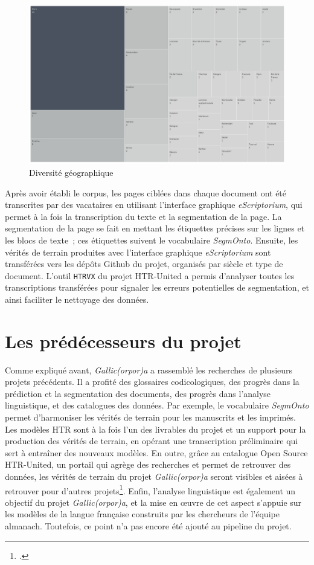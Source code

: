 \documentclass[class=article, crop=false]{standalone}
\begin{document}
\begin{figure}[hbt!]
\includegraphics[width=\textwidth]{../../../images/diversite_ville.png}
\caption{Diversité géographique}
\label{fig:diversite_ville}
\end{figure}

Après avoir établi le corpus, les pages ciblées dans chaque document ont été transcrites par des vacataires en utilisant l'interface graphique \textit{eScriptorium}, qui permet à la fois la transcription du texte et la segmentation de la page. La segmentation de la page se fait en mettant les étiquettes précises sur les lignes et les blocs de texte~; ces étiquettes suivent le vocabulaire \textit{SegmOnto}. Ensuite, les vérités de terrain produites avec l'interface graphique \textit{eScriptorium} sont transférées vers les dépôts Github du projet, organisés par siècle et type de document. L'outil \texttt{HTRVX} du projet \Gls{HTR-United} a permis d'analyser toutes les transcriptions transférées pour signaler les erreurs potentielles de segmentation, et ainsi faciliter le nettoyage des données.


\section{Les prédécesseurs du projet}
Comme expliqué avant, \textit{Gallic(orpor)a} a rassemblé les recherches de plusieurs projets précédents. Il a profité des glossaires codicologiques, des progrès dans la prédiction et la segmentation des documents, des progrès dans l'analyse linguistique, et des catalogues des données. Par exemple, le vocabulaire \textit{SegmOnto} permet d'harmoniser les vérités de terrain pour les manuscrits et les imprimés. Les modèles \acrshort{HTR} sont à la fois l'un des livrables du projet et un support pour la production des vérités de terrain, en opérant une transcription préliminaire qui sert à entraîner des nouveaux modèles. En outre, grâce au catalogue Open Source \Gls{HTR-United}, un portail qui agrège des recherches et permet de retrouver des données, les vérités de terrain du projet \textit{Gallic(orpor)a} seront visibles et aisées à retrouver pour d'autres projets\footcite{chagueSharingHTRDatasets2022}. Enfin, l'analyse linguistique est également un objectif du projet \textit{Gallic(orpor)a}, et la mise en œuvre de cet aspect s'appuie sur les modèles de la langue française construits par les chercheurs de l'équipe \acrshort{almanach}. Toutefois, ce point n'a pas encore été ajouté au pipeline du projet.
\end{document}
